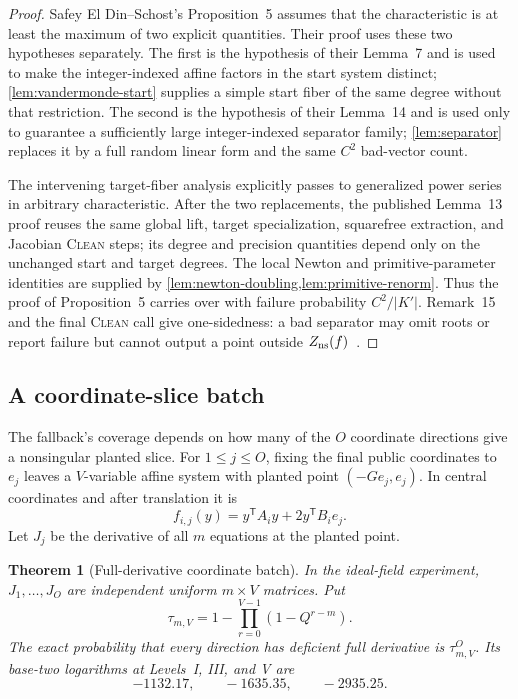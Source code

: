 \documentclass[10pt,a4paper]{article}
\newtheorem{theorem}{Theorem}[section]
\newcommand{\trans}{\mathsf T}
\begin{document}
\begin{proof}
Safey El Din--Schost's Proposition~5 assumes that the characteristic is at least the maximum of two explicit quantities.  Their proof uses these two hypotheses separately.  The first is the hypothesis of their Lemma~7 and is used to make the integer-indexed affine factors in the start system distinct; \cref{lem:vandermonde-start} supplies a simple start fiber of the same degree without that restriction.  The second is the hypothesis of their Lemma~14 and is used only to guarantee a sufficiently large integer-indexed separator family; \cref{lem:separator} replaces it by a full random linear form and the same $C^2$ bad-vector count.

The intervening target-fiber analysis explicitly passes to generalized power series in arbitrary characteristic.  After the two replacements, the published Lemma~13 proof reuses the same global lift, target specialization, squarefree extraction, and Jacobian \textsc{Clean} steps; its degree and precision quantities depend only on the unchanged start and target degrees.  The local Newton and primitive-parameter identities are supplied by \cref{lem:newton-doubling,lem:primitive-renorm}.  Thus the proof of Proposition~5 carries over with failure probability $C^2/|K'|$.  Remark~15 and the final \textsc{Clean} call give one-sidedness: a bad separator may omit roots or report failure but cannot output a point outside $Z_{\rm ns}(f)$~\cite[Lemmas~7, 13, 14, Proposition~5, and Remark~15]{SafeyElDinSchost}.
\end{proof}

\subsection{A coordinate-slice batch}

The fallback's coverage depends on how many of the $O$ coordinate directions give a nonsingular planted slice. For $1\le j\le O$, fixing the final public coordinates to $e_j$ leaves a $V$-variable affine system with planted point $(-Ge_j,e_j)$. In central coordinates and after translation it is
\[
f_{i,j}(y)=y^{\trans}A_iy+2y^{\trans}B_ie_j.
\]
Let $J_j$ be the derivative of all $m$ equations at the planted point.

\begin{theorem}[Full-derivative coordinate batch]\label{thm:coordinate-batch}
In the ideal-field experiment, $J_1,\ldots,J_O$ are independent uniform $m\times V$ matrices. Put
\[
\tau_{m,V}=1-\prod_{r=0}^{V-1}(1-Q^{r-m}).
\]
The exact probability that every direction has deficient full derivative is $\tau_{m,V}^{O}$.  Its base-two logarithms at Levels~I, III, and V are
\[
-1132.17,\qquad -1635.35,\qquad -2935.25.
\]
\end{theorem}
\end{document}
